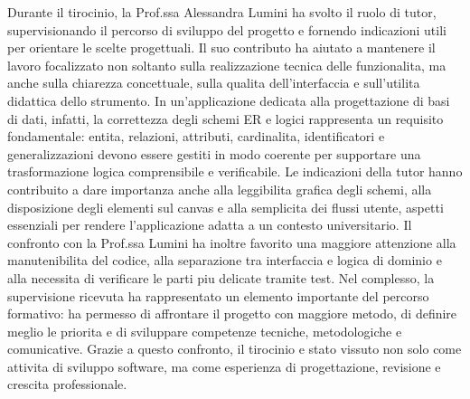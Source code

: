 Durante il tirocinio, la Prof.ssa Alessandra Lumini ha svolto il ruolo di tutor, supervisionando il percorso di sviluppo del progetto \builder{} e fornendo indicazioni utili per orientare le scelte progettuali. Il suo contributo ha aiutato a mantenere il lavoro focalizzato non soltanto sulla realizzazione tecnica delle funzionalita, ma anche sulla chiarezza concettuale, sulla qualita dell'interfaccia e sull'utilita didattica dello strumento. In un'applicazione dedicata alla progettazione di basi di dati, infatti, la correttezza degli schemi ER e logici rappresenta un requisito fondamentale: entita, relazioni, attributi, cardinalita, identificatori e generalizzazioni devono essere gestiti in modo coerente per supportare una trasformazione logica comprensibile e verificabile. Le indicazioni della tutor hanno contribuito a dare importanza anche alla leggibilita grafica degli schemi, alla disposizione degli elementi sul canvas e alla semplicita dei flussi utente, aspetti essenziali per rendere l'applicazione adatta a un contesto universitario. Il confronto con la Prof.ssa Lumini ha inoltre favorito una maggiore attenzione alla manutenibilita del codice, alla separazione tra interfaccia e logica di dominio e alla necessita di verificare le parti piu delicate tramite test. Nel complesso, la supervisione ricevuta ha rappresentato un elemento importante del percorso formativo: ha permesso di affrontare il progetto con maggiore metodo, di definire meglio le priorita e di sviluppare competenze tecniche, metodologiche e comunicative. Grazie a questo confronto, il tirocinio e stato vissuto non solo come attivita di sviluppo software, ma come esperienza di progettazione, revisione e crescita professionale.
